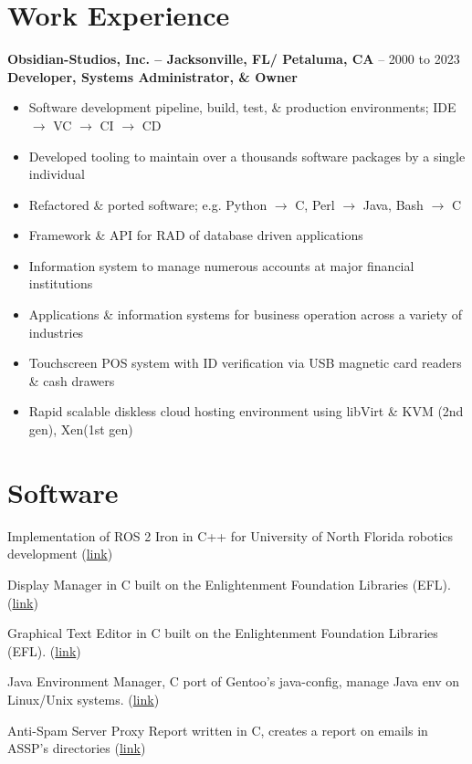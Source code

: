 \documentclass[10pt]{report}
\begin{document}
\section*{Work Experience}
\textbf{Obsidian-Studios, Inc. – Jacksonville, FL/ Petaluma, CA} – 2000 to 2023\newline
\textbf{Developer, Systems Administrator, \& Owner}
\begin{itemize}
  \item Software development pipeline, build, test, \& production environments; IDE $\rightarrow$ VC $\rightarrow$ CI $\rightarrow$ CD
  \item Developed tooling to maintain over a thousands software packages by a single individual
  \item Refactored \& ported software; e.g. Python $\rightarrow$ C, Perl $\rightarrow$ Java, Bash $\rightarrow$ C
  \item Framework \& API for RAD of database driven applications
  \item Information system to manage numerous accounts at major financial institutions
  \item Applications \& information systems for business operation across a variety of industries
  \item Touchscreen POS system with ID verification via USB magnetic card readers \& cash drawers
  \item Rapid scalable diskless cloud hosting environment using libVirt \& KVM (2nd gen), Xen(1st gen)

\end{itemize}

\section*{Software}
\begin{description}[style=multiline,leftmargin=7em]
  \item [osprey\_ros] Implementation of ROS 2 Iron in C++ for University of North Florida robotics development (\href{https://github.com/Osprey-Robotics/osprey_ros}{link})
  \item [entrance] Display Manager in C built on the Enlightenment Foundation Libraries (EFL). (\href{https://github.com/Obsidian-StudiosInc/entrance}{link})
  \item [ecrire] Graphical Text Editor in C built on the Enlightenment Foundation Libraries (EFL). (\href{https://github.com/Obsidian-StudiosInc/ecrire}{link})
  \item [jem] Java Environment Manager, C port of Gentoo's java-config, manage Java env on Linux/Unix systems. (\href{https://github.com/Obsidian-StudiosInc/jem}{link})
  \item [asspr] Anti-Spam Server Proxy Report written in C, creates a report on emails in ASSP's directories (\href{https://github.com/Obsidian-StudiosInc/asspr}{link})
\end{description}
\end{document}

